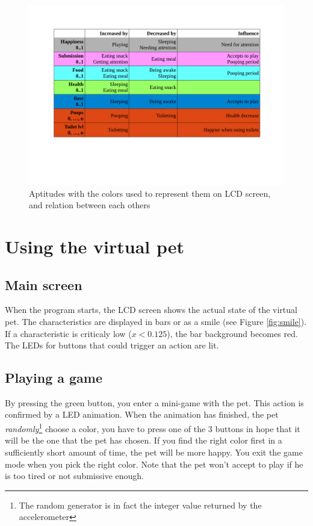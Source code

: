\documentclass[a4paper]{article}
\begin{document}
\begin{figure}[h]
  \centering
  \includegraphics[width=\textwidth]{Aptitudes-balancing.pdf}
  \caption{\label{fig:aptitudes} Aptitudes with the colors used to represent them on LCD screen, and relation between each others}
\end{figure}

\section{Using the virtual pet}
\subsection{Main screen}
When the program starts, the LCD screen shows the actual state of the virtual pet. The characteristics are displayed in bars or as a smile (see Figure \ref{fig:smile}). If a characteristic is criticaly low ($ x < 0.125$), the bar background becomes red. The LEDs for buttons that could trigger an action are lit.

\subsection{Playing a game}
By pressing the green button, you enter a mini-game with the pet. This action is confirmed by a LED animation. When the animation has finished, the pet \textit{randomly}\footnote{The random generator is in fact the integer value returned by the accelerometer} choose a color, you have to press one of the 3 buttons in hope that it will be the one that the pet has chosen. If you find the right color first in a sufficiently short amount of time, the pet will be more happy. You exit the game mode when you pick the right color. Note that the pet won't accept to play if he is too tired or not submissive enough.
\end{document}
